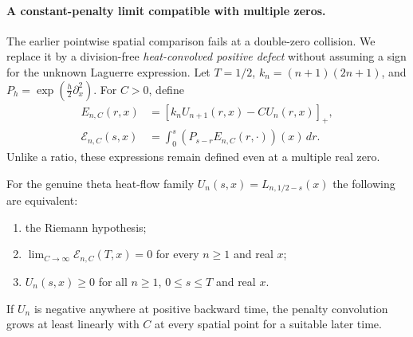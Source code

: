 \paragraph{A constant-penalty limit compatible with multiple zeros.}
The earlier pointwise spatial comparison fails at a
double-zero collision. We replace it by a division-free
\emph{heat-convolved positive defect} without assuming
a sign for the unknown Laguerre expression.
Let $T=1/2$, $k_n=(n+1)(2n+1)$, and
$P_h=\exp(\frac h2\partial_x^2)$.
For $C>0$, define
\begin{align}
E_{n,C}(r,x)
&=[k_nU_{n+1}(r,x)-CU_n(r,x)]_+,
\label{eq:penalty-defect}\\
\mathcal E_{n,C}(s,x)
&=\int_0^s(P_{s-r}E_{n,C}(r,\cdot))(x)\,dr.
\label{eq:penalty-convolution}
\end{align}
Unlike a ratio, these expressions remain defined
even at a multiple real zero.

\begin{theorem}
\label{thm:penaltycriterion}
For the genuine theta heat-flow family
$U_n(s,x)=L_{n,1/2-s}(x)$ the following are
equivalent:
\begin{enumerate}
\item the Riemann hypothesis;
\item $\lim_{C\to\infty}\mathcal E_{n,C}(T,x)=0$
for every $n\ge1$ and real $x$;
\item $U_n(s,x)\ge0$ for all $n\ge1$,
$0\le s\le T$ and real $x$.
\end{enumerate}
If $U_n$ is negative anywhere at positive
backward time, the penalty convolution grows
at least linearly with $C$ at every spatial
point for a suitable later time.
\end{theorem}

